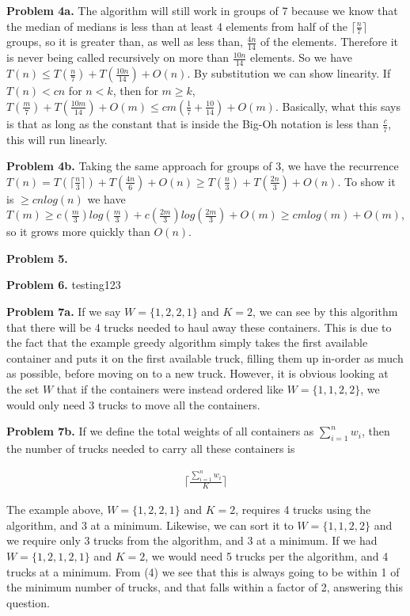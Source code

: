 \documentclass{article}
\begin{document}
\hfill

\textbf{Problem 4a.} The algorithm will still work in groups of 7 because we know that the median of medians is less than at least 4 elements from half of the $\lceil \frac{n}{7} \rceil$ groups, so it is greater than, as well as less than, $\frac{4n}{14}$ of the elements. Therefore it is never being called recursively on more than $\frac{10n}{14}$ elements. So we have $T(n) \leq T(\frac{n}{7}) + T(\frac{10n}{14}) + O(n)$. By substitution we can show linearity. If $T(n) < cn$ for $n < k$, then for $m \geq k$, $T(\frac{m}{7}) + T(\frac{10m}{14}) + O(m) \leq cm(\frac{1}{7} + \frac{10}{14}) + O(m)$. Basically, what this says is that as long as the constant that is inside the Big-Oh notation is less than $\frac{c}{7}$, this will run linearly. 

\hfill

\textbf{Problem 4b.} Taking the same approach for groups of 3, we have the recurrence $T(n) = T(\lceil \frac{n}{3} \rceil) + T(\frac{4n}{6}) + O(n) \geq T(\frac{n}{3}) + T(\frac{2n}{3}) + O(n)$. To show it is $\geq cnlog(n)$ we have $T(m) \geq c(\frac{m}{3})log(\frac{m}{3}) + c(\frac{2m}{3})log(\frac{2m}{3}) + O(m) \geq cmlog(m) + O(m)$, so it grows more quickly than $O(n)$.

\hfill

\textbf{Problem 5.}

\hfill

\textbf{Problem 6.} testing123

\hfill

\textbf{Problem 7a.} If we say $W = \{1, 2, 2, 1\}$ and $K = 2$, we can see by this algorithm that there will be 4 trucks needed to haul away these containers. This is due to the fact that the example greedy algorithm simply takes the first available container and puts it on the first available truck, filling them up in-order as much as possible, before moving on to a new truck. However, it is obvious looking at the set $W$ that if the containers were instead ordered like $W = \{1, 1, 2, 2\}$, we would only need 3 trucks to move all the containers.

\hfill

\textbf{Problem 7b.} If we define the total weights of all containers as $\sum_{i=1}^{n} w_i$, then the number of trucks needed to carry all these containers is 

\begin{gather}
    \lceil \frac{\sum_{i=1}^{n} w_i}{K} \rceil
\end{gather}

The example above, $W = \{1, 2, 2, 1\}$ and $K = 2$, requires 4 trucks using the algorithm, and 3 at a minimum. Likewise, we can sort it to $W = \{1, 1, 2, 2\}$ and we require only 3 trucks from the algorithm, and 3 at a minimum. If we had $W = \{1, 2, 1, 2, 1\}$ and $K = 2$, we would need 5 trucks per the algorithm, and 4 trucks at a minimum. From (4) we see that this is always going to be within 1 of the minimum number of trucks, and that falls within a factor of 2, answering this question.

\newpage
 

\end{document}
